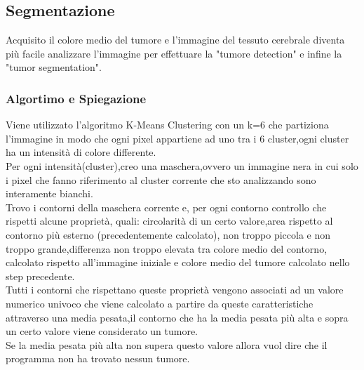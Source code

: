 \documentclass{article}
\begin{document}
\subsection{Segmentazione}
Acquisito il colore medio del tumore e l'immagine del tessuto cerebrale diventa più facile analizzare l'immagine per effettuare la "tumore detection" e infine la "tumor segmentation".\\
\subsubsection{Algortimo e Spiegazione}
Viene utilizzato l'algoritmo K-Means Clustering con un k=6 che partiziona l'immagine in modo che ogni pixel appartiene ad uno tra i 6 cluster,ogni cluster ha un intensità di colore differente.\\
Per ogni intensità(cluster),creo una maschera,ovvero un immagine nera in cui solo i pixel che fanno riferimento al cluster corrente che sto analizzando sono interamente bianchi.\\
Trovo i contorni della maschera corrente e, per ogni contorno controllo che rispetti alcune proprietà, quali: circolarità di un certo valore,area rispetto al contorno più esterno (precedentemente calcolato), non troppo piccola e non troppo grande,differenza non troppo elevata tra colore medio del contorno, calcolato rispetto all'immagine iniziale e colore medio del tumore calcolato nello step precedente.\\
Tutti i contorni che rispettano queste proprietà vengono associati ad un valore numerico univoco che viene calcolato a partire da queste caratteristiche attraverso una media pesata,il contorno che ha la media pesata più alta e sopra un certo valore viene considerato un tumore.\\
Se la media pesata più alta non supera questo valore allora vuol dire che il programma non ha trovato nessun tumore.
\end{document}
